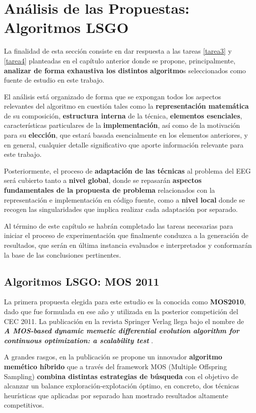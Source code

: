 \chapter{Análisis de las Propuestas: Algoritmos LSGO}

La finalidad de esta sección consiste en dar respuesta a las tareas \ref{tarea3} y \ref{tarea4} planteadas en el capítulo anterior donde se propone, principalmente, \textbf{analizar de forma exhaustiva los distintos algoritmo}s seleccionados como fuente de estudio en este trabajo. 

El análisis está organizado de forma que se expongan todos los aspectos relevantes del algoritmo en cuestión tales como la \textbf{representación matemática} de su composición, \textbf{estructura interna} de la técnica, \textbf{elementos esenciales}, características particulares de la \textbf{implementación}, así como de la motivación para su \textbf{elección}, que estará basada esencialmente en los elementos anteriores, y en general, cualquier detalle significativo que aporte información relevante para este trabajo.

Posteriormente, el proceso de \textbf{adaptación de las técnicas} al problema del EEG será cubierto tanto a \textbf{nivel global}, donde se repasarán \textbf{aspectos fundamentales de la propuesta de problema} relacionados con la representación e implementación en código fuente, como a \textbf{nivel local} donde se recogen las singularidades que implica realizar cada adaptación por separado.

Al término de este capítulo se habrán completado las tareas necesarias para iniciar el proceso de experimentación que finalmente conduzca a la generación de resultados, que serán en última instancia evaluados e interpretados y conformarán la base de las conclusiones pertinentes.

\section{Algoritmos LSGO: MOS 2011}
La primera propuesta elegida para este estudio es la conocida como \textbf{MOS2010}, dado que fue formulada en ese año y utilizada en la posterior competición del CEC 2011\cite{ComprehensiveComparison}. La publicación en la revista Springer Verlag llega bajo el nombre de \textbf{\textit{A MOS-based dynamic memetic differential evolution algorithm for continuous optimization: a scalability test}} \cite{MOS2010}.

A grandes rasgos, en la publicación se propone un innovador \textbf{algoritmo memético híbrido} que a través del framework MOS (Multiple Offspring Sampling) \textbf{combina distintas estrategias de búsqueda} con el objetivo de alcanzar un balance exploración-explotación óptimo, en concreto, dos técnicas heurísticas que aplicadas por separado han mostrado resultados altamente competitivos.

